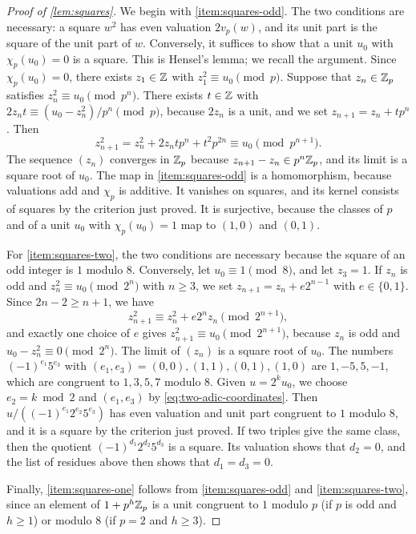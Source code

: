 \begin{proof}[Proof of \cref{lem:squares}]
We begin with \ref{item:squares-odd}. The two conditions are necessary: a square $w^2$ has even valuation $2v_p(w)$, and its unit part is the square of the unit part of $w$. Conversely, it suffices to show that a unit $u_0$ with $\chi_p(u_0)=0$ is a square. This is Hensel's lemma; we recall the argument. Since $\chi_p(u_0)=0$, there exists $z_1\in\mathbb Z$ with $z_1^2\equiv u_0\pmod p$. Suppose that $z_n\in\mathbb Z_p$ satisfies $z_n^2\equiv u_0\pmod{p^n}$. There exists $t\in\mathbb Z$ with $2z_nt\equiv(u_0-z_n^2)/p^n\pmod p$, because $2z_n$ is a unit, and we set $z_{n+1}=z_n+tp^n$. Then
\begin{equation}
z_{n+1}^2=z_n^2+2z_ntp^n+t^2p^{2n}\equiv u_0\pmod{p^{n+1}}.
\end{equation}
The sequence $(z_n)$ converges in $\mathbb Z_p$ because $z_{n+1}-z_n\in p^n\mathbb Z_p$, and its limit is a square root of $u_0$. The map in \ref{item:squares-odd} is a homomorphism, because valuations add and $\chi_p$ is additive. It vanishes on squares, and its kernel consists of squares by the criterion just proved. It is surjective, because the classes of $p$ and of a unit $u_0$ with $\chi_p(u_0)=1$ map to $(1,0)$ and $(0,1)$.

For \ref{item:squares-two}, the two conditions are necessary because the square of an odd integer is $1$ modulo $8$. Conversely, let $u_0\equiv1\pmod8$, and let $z_3=1$. If $z_n$ is odd and $z_n^2\equiv u_0\pmod{2^n}$ with $n\ge3$, we set $z_{n+1}=z_n+e2^{n-1}$ with $e\in\{0,1\}$. Since $2n-2\ge n+1$, we have
\begin{equation}
z_{n+1}^2\equiv z_n^2+e2^nz_n\pmod{2^{n+1}},
\end{equation}
and exactly one choice of $e$ gives $z_{n+1}^2\equiv u_0\pmod{2^{n+1}}$, because $z_n$ is odd and $u_0-z_n^2\equiv0\pmod{2^n}$. The limit of $(z_n)$ is a square root of $u_0$. The numbers $(-1)^{e_1}5^{e_3}$ with $(e_1,e_3)=(0,0),(1,1),(0,1),(1,0)$ are $1,-5,5,-1$, which are congruent to $1,3,5,7$ modulo $8$. Given $u=2^ku_0$, we choose $e_2=k\bmod2$ and $(e_1,e_3)$ by \eqref{eq:two-adic-coordinates}. Then $u/((-1)^{e_1}2^{e_2}5^{e_3})$ has even valuation and unit part congruent to $1$ modulo $8$, and it is a square by the criterion just proved. If two triples give the same class, then the quotient $(-1)^{d_1}2^{d_2}5^{d_3}$ is a square. Its valuation shows that $d_2=0$, and the list of residues above then shows that $d_1=d_3=0$.

Finally, \ref{item:squares-one} follows from \ref{item:squares-odd} and \ref{item:squares-two}, since an element of $1+p^h\mathbb Z_p$ is a unit congruent to $1$ modulo $p$ (if $p$ is odd and $h\ge1$) or modulo $8$ (if $p=2$ and $h\ge3$).
\end{proof}

